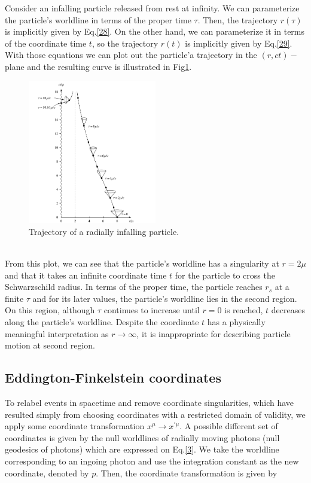 \documentclass[letterpaper,11pt,onecolumn]{article}
\begin{document}
Consider an infalling particle released from rest at infinity. We can parameterize the particle's worldline in terms of the proper time $\tau$. Then, the trajectory $r(\tau)$ is implicitly given by Eq.\ref{28}. On the other hand, we can parameterize it in terms of the coordinate time $t$, so the trajectory $r(t)$ is implicitly given by Eq.\ref{29}. With those equations we can plot out the particle'a trajectory in the $(r,ct)-$plane and the resulting curve is illustrated in Fig\ref{fig12}.
\begin{figure}[h!]
    \centering
    \includegraphics[width=0.5\textwidth]{Report/Images/4bhparticles.png}
    \caption{Trajectory of a radially infalling particle.}
    \label{fig12}
\end{figure}\\
From this plot, we can see that the particle's worldline has a singularity at $r=2\mu$ and that it takes an infinite coordinate time $t$ for the particle to cross the Schwarzschild radius. In terms of the proper time, the particle reaches $r_s$ at a finite $\tau$ and for its later values, the particle's worldline lies in the second region. On this region, although $\tau$ continues to increase until $r=0$ is reached, $t$ decreases along the particle's worldline. Despite the coordinate $t$ has a physically meaningful interpretation as $r\rightarrow \infty$, it is inappropriate for describing particle motion at second region.\\

\subsection{Eddington-Finkelstein coordinates}

To relabel events in spacetime and remove coordinate singularities, which have resulted simply from choosing coordinates with a restricted domain of validity, we apply some coordinate transformation $x^{\mu}\rightarrow x^{'\mu}$. A possible different set of coordinates is given by the null worldlines of radially moving photons (null geodesics of photons) which are expressed on Eq.\ref{3}. We take the worldline corresponding to an ingoing photon and use the integration constant as the new coordinate, denoted by $p$. Then, the coordinate transformation is given by 
\end{document}
